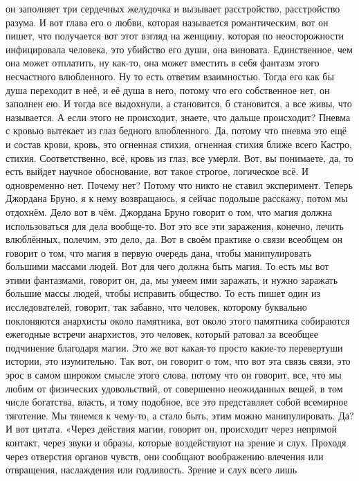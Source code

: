 он заполняет три сердечных желудочка и вызывает расстройство, расстройство
разума. И вот глава его о любви, которая называется романтическим, вот он пишет,
что получается вот этот взгляд на женщину, которая по неосторожности
инфицировала человека, это убийство его души, она виновата. Единственное, чем
она может отплатить, ну как-то, она может вместить в себя фантазм этого
несчастного влюбленного. Ну то есть ответим взаимностью. Тогда его как бы душа
переходит в неё, и её душа в него, потому что его собственное нет, он заполнен
ею. И тогда все выдохнули, а становится, б становится, а все живы, что
называется. А если этого не происходит, знаете, что дальше происходит? Пневма с
кровью вытекает из глаз бедного влюбленного. Да, потому что пневма это ещё и
состав крови, кровь, это огненная стихия, огненная стихия ближе всего Кастро,
стихия. Соответственно, всё, кровь из глаз, все умерли. Вот, вы понимаете, да,
то есть выйдет научное обоснование, вот такое строгое, логическое всё. И
одновременно нет. Почему нет? Потому что никто не ставил эксперимент. Теперь
Джордана Бруно, я к нему возвращаюсь, я сейчас подольше расскажу, потом мы
отдохнём. Дело вот в чём. Джордана Бруно говорит о том, что магия должна
использоваться для дела вообще-то. Вот это все эти заражения, конечно, лечить
влюблённых, полечим, это дело, да. Вот в своём практике о связи всеобщем он
говорит о том, что магия в первую очередь дана, чтобы манипулировать большими
массами людей. Вот для чего должна быть магия. То есть мы вот этими фантазмами,
говорит он, да, мы умеем ими заражать, и нужно заражать большие массы людей,
чтобы исправить общество. То есть пишет один из исследователей, говорит, так
забавно, что человек, которому буквально поклоняются анархисты около памятника,
вот около этого памятника собираются ежегодные встречи анархистов, это человек,
который ратовал за всеобщее подчинение благодаря магии. Это же вот какая-то
просто какие-то перевертуши истории, это изумительно. Так вот, он говорит о том,
что вот эта связь связи, это эрос в самом широком смысле этого слова, потому что
он говорит, все, что мы любим от физических удовольствий, от совершенно
неожиданных вещей, в том числе богатства, власть, и тому подобное, все это
представляет собой всемирное тяготение. Мы тянемся к чему-то, а стало быть, этим
можно манипулировать. Да? И вот цитата. «Через действия магии, говорит он,
происходит через непрямой контакт, через звуки и образы, которые воздействуют на
зрение и слух. Проходя через отверстия органов чувств, они сообщают воображению
влечения или отвращения, наслаждения или годливость. Зрение и слух всего лишь
